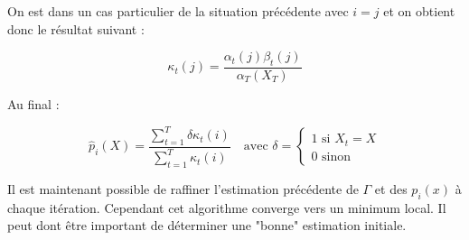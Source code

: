 \documentclass[12pt, french]{report}
\begin{document}
On est dans un cas particulier de la situation précédente avec $i=j$ et on obtient donc le résultat suivant :

\begin{equation}
\kappa_t(j) = \frac{\alpha_t(j)\beta_t(j)}{\alpha_T(X_T)}
\end{equation}

Au final :

\begin{equation}
\hat{p}_i(X) = \frac
{\sum\limits_{t=1}^T  \delta \kappa_t(i)}
{\sum\limits_{t=1}^T  \kappa_t(i)}
\quad \text{avec } \delta=
\begin{cases}
1\text{ si }X_t=X \\
0\text{ sinon}
\end{cases}
\end{equation}

Il est maintenant possible de raffiner l'estimation précédente de $\Gamma$ et des $p_i(x)$ à chaque itération. Cependant cet algorithme converge vers un minimum local. Il peut dont être important de déterminer une "bonne" estimation initiale.




\end{document}
